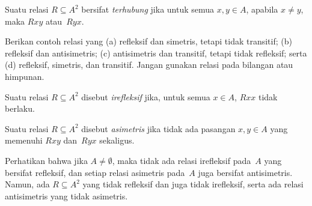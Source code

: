 \documentclass[../../../include/open-logic-section]{subfiles}
\begin{document}
\begin{defn}[Keterhubungan]
Suatu relasi $R \subseteq A^2$ bersifat \emph{terhubung} jika untuk semua
$x,y\in A$, apabila $x \neq y$, maka $Rxy$ atau~$Ryx$.
\end{defn}

\begin{prob}
Berikan contoh relasi yang (a) refleksif dan simetris, tetapi tidak transitif;
(b) refleksif dan antisimetris; (c) antisimetris dan transitif, tetapi tidak
refleksif; serta (d) refleksif, simetris, dan transitif. Jangan gunakan relasi
pada bilangan atau himpunan.
\end{prob}

\begin{defn}[Irefleksivitas]
Suatu relasi $R \subseteq A^2$ disebut \emph{irefleksif} jika, untuk semua
$x \in A$, $Rxx$ tidak berlaku.
\end{defn}

\begin{defn}[Asimetri]
Suatu relasi $R \subseteq A^2$ disebut \emph{asimetris} jika tidak ada pasangan
$x,y\in A$ yang memenuhi $Rxy$ dan~$Ryx$ sekaligus.
\end{defn}

Perhatikan bahwa jika $A \neq \emptyset$, maka tidak ada relasi irefleksif
pada~$A$ yang bersifat refleksif, dan setiap relasi asimetris pada~$A$ juga
bersifat antisimetris. Namun, ada $R \subseteq A^2$ yang tidak refleksif dan
juga tidak irefleksif, serta ada relasi antisimetris yang tidak asimetris.
\end{document}

